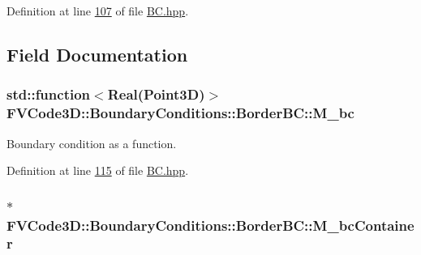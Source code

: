 Definition at line \hyperlink{BC_8hpp_source_l00107}{107} of file \hyperlink{BC_8hpp_source}{B\+C.\+hpp}.



\subsection{Field Documentation}
\subsubsection[{\texorpdfstring{M\+\_\+bc}{M_bc}}]{\setlength{\rightskip}{0pt plus 5cm}std\+::function$<${\bf Real}({\bf Point3D})$>$ F\+V\+Code3\+D\+::\+Boundary\+Conditions\+::\+Border\+B\+C\+::\+M\+\_\+bc\hspace{0.3cm}{\ttfamily [protected]}}\hypertarget{classFVCode3D_1_1BoundaryConditions_1_1BorderBC_a9594b3bde8e7eb818ed4a726dbdc9e0c}{}\label{classFVCode3D_1_1BoundaryConditions_1_1BorderBC_a9594b3bde8e7eb818ed4a726dbdc9e0c}


Boundary condition as a function. 



Definition at line \hyperlink{BC_8hpp_source_l00115}{115} of file \hyperlink{BC_8hpp_source}{B\+C.\+hpp}.

\subsubsection[{\texorpdfstring{M\+\_\+bc\+Container}{M_bcContainer}}]{$\ast$ F\+V\+Code3\+D\+::\+Boundary\+Conditions\+::\+Border\+B\+C\+::\+M\+\_\+bc\+Container\hspace{0.3cm}{\ttfamily [protected]}}\hypertarget{classFVCode3D_1_1BoundaryConditions_1_1BorderBC_ac2e5dff7f5d8966e20e3146d1fb924ca}{}\label{classFVCode3D_1_1BoundaryConditions_1_1BorderBC_ac2e5dff7f5d8966e20e3146d1fb924ca}


